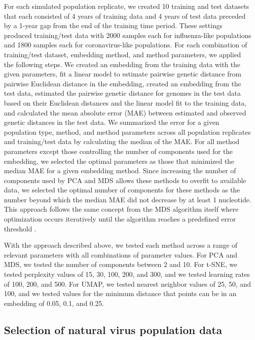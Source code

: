 \documentclass[webpdf,contemporary,large,single]{oup-authoring-template}%
\theoremstyle{thmstyleone}%
\theoremstyle{thmstyletwo}%
\theoremstyle{thmstylethree}%
\begin{document}
For each simulated population replicate, we created 10 training and test datasets that each consisted of 4 years of training data and 4 years of test data preceded by a 1-year gap from the end of the training time period.
These settings produced training/test data with 2000 samples each for influenza-like populations and 1800 samples each for coronavirus-like populations.
For each combination of training/test dataset, embedding method, and method parameters, we applied the following steps.
We created an embedding from the training data with the given parameters, fit a linear model to estimate pairwise genetic distance from pairwise Euclidean distance in the embedding, created an embedding from the test data, estimated the pairwise genetic distance for genomes in the test data based on their Euclidean distances and the linear model fit to the training data, and calculated the mean absolute error (MAE) between estimated and observed genetic distances in the test data.
We summarized the error for a given population type, method, and method parameters across all population replicates and training/test data by calculating the median of the MAE.
For all method parameters except those controlling the number of components used for the embedding, we selected the optimal parameters as those that minimized the median MAE for a given embedding method.
Since increasing the number of components used by PCA and MDS allows these methods to overfit to available data, we selected the optimal number of components for these methods as the number beyond which the median MAE did not decrease by at least 1 nucleotide.
This approach follows the same concept from the MDS algorithm itself where optimization occurs iteratively until the algorithm reaches a predefined error threshold \citep{hout_papesh_goldinger_2012}.

With the approach described above, we tested each method across a range of relevant parameters with all combinations of parameter values.
For PCA and MDS, we tested the number of components between 2 and 10.
For t-SNE, we tested perplexity values of 15, 30, 100, 200, and 300, and we tested learning rates of 100, 200, and 500.
For UMAP, we tested nearest neighbor values of 25, 50, and 100, and we tested values for the minimum distance that points can be in an embedding of 0.05, 0.1, and 0.25.

\subsection{Selection of natural virus population data}
\end{document}
